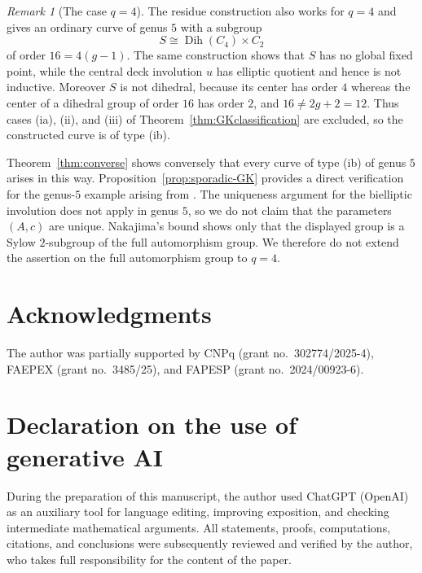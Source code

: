 \documentclass[11pt]{article}
\theoremstyle{remark}
\newtheorem{remark}[theorem]{Remark}
\newcommand{\Dih}{\operatorname{Dih}}
\begin{document}
\begin{remark}[The case $q=4$]\label{rem:smallq}
The residue construction also works for $q=4$ and gives an ordinary
curve of genus $5$ with a subgroup
\[
        S\cong\Dih(C_4)\times C_2
\]
of order $16=4(g-1)$.  The same construction shows that $S$ has no
global fixed point, while the central deck involution $u$ has elliptic
quotient and hence is not inductive.  Moreover $S$ is not dihedral,
because its center has order $4$ whereas the center of a dihedral group
of order $16$ has order $2$, and $16\ne2g+2=12$.  Thus cases
\textup{(ia)}, \textup{(ii)}, and \textup{(iii)} of
Theorem~\ref{thm:GKclassification} are excluded, so the constructed
curve is of type \textup{(ib)}.

Theorem~\ref{thm:converse} shows conversely that every curve of type
\textup{(ib)} of genus $5$ arises in this way.  Proposition~\ref{prop:sporadic-GK}
provides a direct verification for the genus-$5$ example arising from
\cite[Sections~6.4--6.5]{GK2015}.  The uniqueness argument for the
bielliptic involution does not apply in genus $5$, so we do not claim
that the parameters $(A,c)$ are unique.  Nakajima's bound shows only
that the displayed group is a Sylow $2$-subgroup of the full
automorphism group.  We therefore do not extend the assertion on the
full automorphism group to $q=4$.
\end{remark}


\section*{Acknowledgments}

The author was partially supported by CNPq (grant no.~302774/2025-4),
FAEPEX (grant no.~3485/25), and FAPESP (grant no.~2024/00923-6).

\section*{Declaration on the use of generative AI}

During the preparation of this manuscript, the author used ChatGPT (OpenAI) as an auxiliary tool for language editing, improving exposition, and checking intermediate mathematical arguments. All statements, proofs, computations, citations, and conclusions were subsequently reviewed and verified by the author, who takes full responsibility for the content of the paper.
\end{document}
